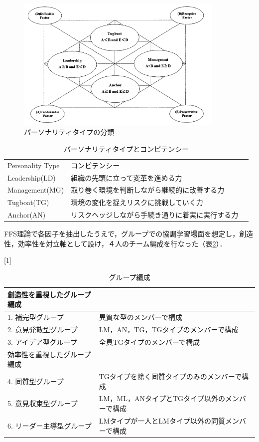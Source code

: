 \documentclass{funthesis}
\begin{document}
\begin{figure}[H]
 \centering
   \includegraphics[width=100mm]{figures/FFS.png}
 \caption{パーソナリティタイプの分類}
 \label{FFS}
\end{figure}


\begin{table}[H]
\begin{center}
  \caption{パーソナリティタイプとコンピテンシー}
  
  \begin{tabular}{lll} \hline
    Personality Type &  コンピテンシー\tabularnewline
    Leadership(LD)& 組織の先頭に立って変革を進める力  \tabularnewline
    Management(MG) & 取り巻く環境を判断しながら継続的に改善する力 \tabularnewline
    Tugboat(TG)& 環境の変化を捉えリスクに挑戦していく力\tabularnewline
    Anchor(AN)&リスクヘッジしながら手続き通りに着実に実行する力 \tabularnewline
    \hline
  \end{tabular}
  \label{FFS理論2}
  \end{center}
\end{table}

FFS理論で各因子を抽出したうえで，グループでの協調学習場面を想定し，創造性，効率性を対立軸として設け，４人のチーム編成を行なった（表\ref{FFS理論3}）．

\begin{table}[H]
\begin{center}
  \caption{グループ編成}
  
  \scalebox{0.9}[1]{
  \begin{tabular}{ll} \hline
    創造性を重視したグループ編成\tabularnewline \hline
   1. 補完型グループ& 異質な型のメンバーで構成  \tabularnewline
   2. 意見発散型グループ & LM，AN，TG，TGタイプのメンバーで構成 \tabularnewline
    3. アイデア型グループ& 全員TGタイプのメンバーで構成\tabularnewline \hline
    効率性を重視したグループ編成 \tabularnewline \hline
    4. 同質型グループ& TGタイプを除く同質タイプのみのメンバーで構成  \tabularnewline
    5. 意見収束型グループ & LM，ML，ANタイプとTGタイプ以外のメンバーで構成 \tabularnewline
    6. リーダー主導型グループ&LMタイプが一人とLMタイプ以外の同質メンバーで構成\tabularnewline
    \hline
  \end{tabular}
  }
  \label{FFS理論3}
  \end{center}
\end{table}
\end{document}
